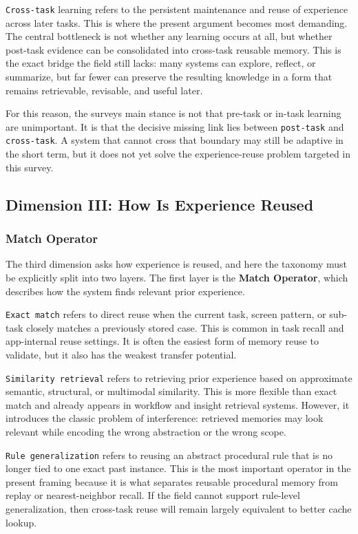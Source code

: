 \documentclass{article}
\begin{document}
\texttt{Cross-task} learning refers to the persistent maintenance and
reuse of experience across later tasks. This is where the present
argument becomes most demanding. The central bottleneck is not whether
any learning occurs at all, but whether post-task evidence can be
consolidated into cross-task reusable memory. This is the exact bridge
the field still lacks: many systems can explore, reflect, or summarize,
but far fewer can preserve the resulting knowledge in a form that
remains retrievable, revisable, and useful later.

For this reason, the survey\textquotesingle s main stance is not that
pre-task or in-task learning are unimportant. It is that the decisive
missing link lies between \texttt{post-task} and \texttt{cross-task}. A
system that cannot cross that boundary may still be adaptive in the
short term, but it does not yet solve the experience-reuse problem
targeted in this survey.

\subsection{Dimension III: How Is Experience
Reused}\label{43-dimension-iii-how-is-experience-reused}

\subsubsection{Match Operator}\label{431-match-operator}

The third dimension asks how experience is reused, and here the taxonomy
must be explicitly split into two layers. The first layer is the
\textbf{Match Operator}, which describes how the system finds relevant
prior experience.

\texttt{Exact\ match} refers to direct reuse when the current task,
screen pattern, or sub-task closely matches a previously stored case.
This is common in task recall and app-internal reuse settings. It is
often the easiest form of memory reuse to validate, but it also has the
weakest transfer potential.

\texttt{Similarity\ retrieval} refers to retrieving prior experience
based on approximate semantic, structural, or multimodal similarity.
This is more flexible than exact match and already appears in workflow
and insight retrieval systems. However, it introduces the classic
problem of interference: retrieved memories may look relevant while
encoding the wrong abstraction or the wrong scope.

\texttt{Rule\ generalization} refers to reusing an abstract procedural
rule that is no longer tied to one exact past instance. This is the most
important operator in the present framing because it is what separates
reusable procedural memory from replay or nearest-neighbor recall. If
the field cannot support rule-level generalization, then cross-task
reuse will remain largely equivalent to better cache lookup.
\end{document}
